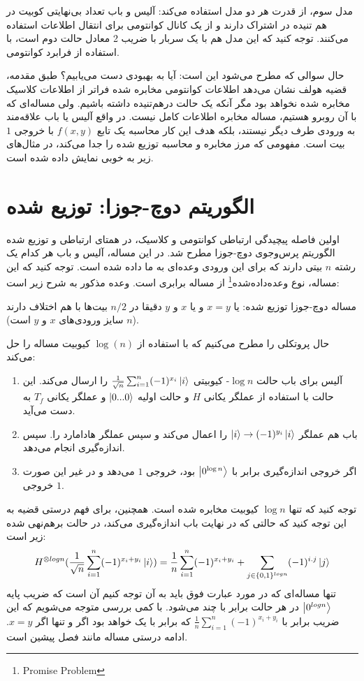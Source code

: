 مدل سوم، از قدرت هر دو مدل استفاده می‌کند: آلیس و باب تعداد بی‌نهایتی کوبیت در هم تنیده در اشتراک دارند و از یک کانال کوانتومی برای انتقال اطلاعات استفاده می‌کنند. توجه کنید که این مدل هم با یک سربار با ضریب 2 معادل حالت دوم است، با استفاده از فرابرد کوانتومی. 

حال سوالی که مطرح می‌شود این است: آیا به بهبودی دست می‌یابیم؟ طبق مقدمه، قضیه هولف نشان می‌دهد اطلاعات کوانتومی مخابره شده فراتر از اطلاعات کلاسیک مخابره شده نخواهد بود مگر آنکه یک حالت درهم‌تنیده داشته باشیم. ولی مساله‌ای که با آن روبرو هستیم، مساله مخابره اطلاعات کامل نیست. در واقع آلیس یا باب علاقه‌مند به ورودی طرف دیگر نیستند، بلکه هدف این کار محاسبه یک تابع $f(x,y)$ با خروجی $1$ بیت است. مفهومی که مرز مخابره و محاسبه توزیع شده را جدا می‌کند، در مثال‌های زیر به خوبی نمایش داده شده است. 

\section{الگوریتم دوچ-جوزا: توزیع شده}\label{djd}
اولین فاصله پیچیدگی ارتباطی کوانتومی و کلاسیک، در همتای ارتباطی و توزیع شده الگوریتم پرس‌وجوی دوچ-جوزا مطرح شد.
\cite{cleve98}
در این مساله، آلیس و باب هر کدام یک رشته $n$ بیتی دارند که برای این ورودی وعده‌ای به ما داده شده است. توجه کنید که این مساله، نوع وعده‌داده‌شده\footnote{Promise Problem} از مساله برابری است. وعده مذکور به شرح زیر است:

\begin{center}
	مساله دوچ-جوزا توزیع شده: یا $x=y$ و یا $x$ و $y$ دقیقا در $n/2$ بیت‌ها با هم اختلاف دارند ($n$ سایز ورودی‌های $x$ و $y$ است).
\end{center}
حال پروتکلی را مطرح می‌کنیم که با استفاده از
 $\log(n)$ کیوبیت مساله را حل می‌کند: 
\begin{enumerate}
	\item آلیس برای باب حالت
			$\log{n}$-
				کیوبیتی 
				$\frac{1}{\sqrt{n}}\sum_{i=1}^{n}(-1)^{x_{i}}\ket{i}$ 
				را ارسال می‌کند. این حالت با استفاده از عملگر یکانی $H$ و حالت اولیه
				 $\ket{0...0}$ و عملگر یکانی $T_{f}$ به دست می‌آید. 
		
		\item  باب هم عملگر $\ket{i} \to (-1)^{y_{i}}\ket{i}$ را اعمال می‌کند و سپس عملگر هادامارد را. سپس اندازه‌گیری انجام می‌دهد.
		\item اگر خروجی اندازه‌گیری برابر با $\ket{0^{\log{n}}}$ بود، خروجی $1$ می‌دهد و در غیر این صورت خروجی $1$.
\end{enumerate}
توجه کنید که تنها
 $\log{n}$ کیوبیت مخابره شده است. همچنین، برای فهم درستی قضیه به این توجه کنید که حالتی که در نهایت باب اندازه‌گیری می‌کند، در حالت برهم‌نهی شده زیر است: 
\begin{equation}
	H^{\otimes log{n}}(\frac{1}{\sqrt{n}} \sum_{i=1}^{n} (-1)^{x_{i}+y_{i}}\ket{i}) = \frac{1}{n}  \sum_{i=1}^{n} (-1)^{x_{i}+y_{i}} +  \sum_{j \in \{0,1\}^{log{n}}} (-1)^{i.j}\ket{j}
\end{equation}
 تنها مساله‌ای که در مورد عبارت فوق باید به آن توجه کنیم آن است که ضریب پایه $\ket{0^{log{n}}}$ در هر حالت برابر با چند می‌شود. با کمی بررسی متو‌جه می‌شویم که این ضریب برابر با 
 $\frac{1}{n}\sum_{i=1}^{n}(-1)^{x_{i}+y_{i}}$ 
 که برابر با یک خواهد بود اگر و تنها اگر $x=y$. ادامه درستی مساله مانند فصل پیشین است. 
 
